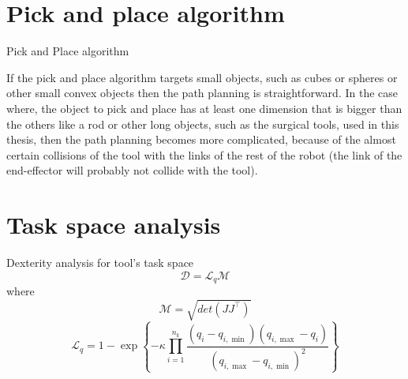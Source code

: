 \section{Pick and place algorithm}

\begin{algorithm}[H]
\SetAlgoLined
{}
\caption{Pick and Place algorithm}
\end{algorithm}

If the pick and place algorithm targets small objects, such as cubes or spheres or other small convex objects then the path planning is straightforward. In the case where, the object to pick and place has at least one 
dimension that is bigger than the others like a rod or other long objects, such as the surgical tools, used in this thesis, then the path planning becomes more complicated, because of the almost certain collisions 
of the tool with the links of the rest of the robot (the link of the end-effector will probably not collide with the tool).


\section{Task space analysis}

Dexterity analysis for tool's task space
\begin{equation}
\mathcal{D} = \mathcal{L}_q \mathcal{M}
\label{dexterity-measure}
\end{equation}
where
\begin{equation}
\mathcal{M} = \sqrt{det(J J^\top)}
\end{equation}
\begin{equation}
\label{joint-limit-measure}
\mathcal{L}_{q}=1-\exp\left\{-\kappa\prod_{i=1}^{n_{k}}\frac{(q_{ {i}}-q_{i,\min})(q_{i,\max}-q_{i})}{(q_{i,\max}-q_{i,\min})^{2}}\right\}
\end{equation}

